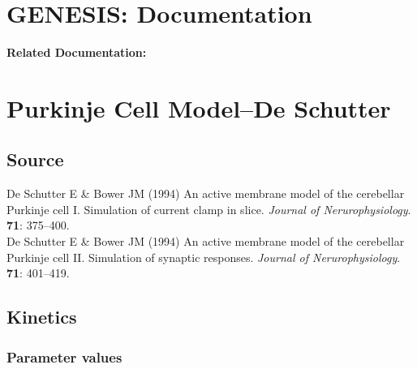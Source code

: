 \documentclass[12pt]{article}
\begin{document}
\section*{GENESIS: Documentation}

{\bf Related Documentation:}

\section*{Purkinje Cell Model--De Schutter}

\subsection*{Source}

De Schutter E \& Bower JM (1994) An active membrane model of the cerebellar Purkinje cell I. Simulation of current clamp in slice. {\it Journal of Nerurophysiology}. {\bf 71}: 375--400. \\

\noindent De Schutter E \& Bower JM (1994) An active membrane model of the cerebellar Purkinje cell II. Simulation of synaptic responses. {\it Journal of Nerurophysiology}. {\bf 71}: 401--419.

\subsection*{Kinetics}

\subsubsection*{Parameter values}
\end{document}
